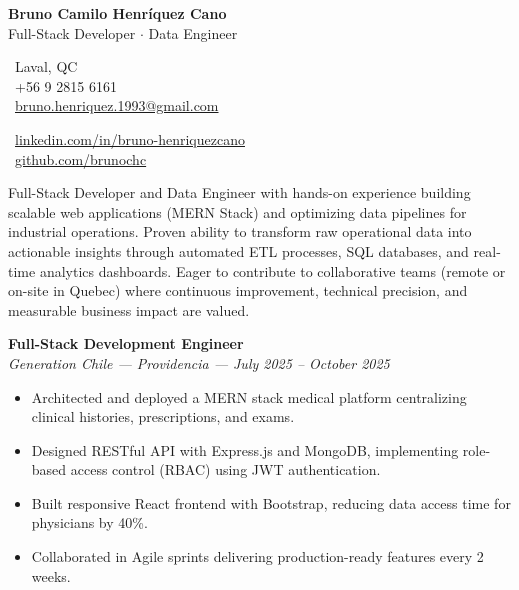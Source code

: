 \documentclass[10pt,letterpaper]{article}
\begin{document}
\begin{center}
    {\Huge \textbf{Bruno Camilo Henríquez Cano}} \\[0.2cm]
    {\Large Full-Stack Developer $\cdot$ Data Engineer}
\end{center}

\vspace{0.3cm}

\noindent
\begin{minipage}[t]{0.5\textwidth}
    \faMapMarker\ Laval, QC \\
    \faPhone\ +56 9 2815 6161 \\
    \faEnvelope\ \href{mailto:bruno.henriquez.1993@gmail.com}{bruno.henriquez.1993@gmail.com}
\end{minipage}
\begin{minipage}[t]{0.5\textwidth}
    \faLinkedin\ \href{https://linkedin.com/in/bruno-henriquezcano}{linkedin.com/in/bruno-henriquezcano} \\
    \faGithub\ \href{https://github.com/brunochc}{github.com/brunochc}
\end{minipage}

\vspace{0.4cm}


\vspace{0.2cm}

\noindent Full-Stack Developer and Data Engineer with hands-on experience building scalable web applications (MERN Stack) and optimizing data pipelines for industrial operations. Proven ability to transform raw operational data into actionable insights through automated ETL processes, SQL databases, and real-time analytics dashboards. Eager to contribute to collaborative teams (remote or on-site in Quebec) where continuous improvement, technical precision, and measurable business impact are valued.

\vspace{0.4cm}


\vspace{0.3cm}

\noindent \textbf{Full-Stack Development Engineer} \\
\textit{Generation Chile — Providencia — July 2025 – October 2025}
\begin{itemize}
    \item Architected and deployed a MERN stack medical platform centralizing clinical histories, prescriptions, and exams.
    \item Designed RESTful API with Express.js and MongoDB, implementing role-based access control (RBAC) using JWT authentication.
    \item Built responsive React frontend with Bootstrap, reducing data access time for physicians by 40\%.
    \item Collaborated in Agile sprints delivering production-ready features every 2 weeks.
\end{itemize}
\end{document}
